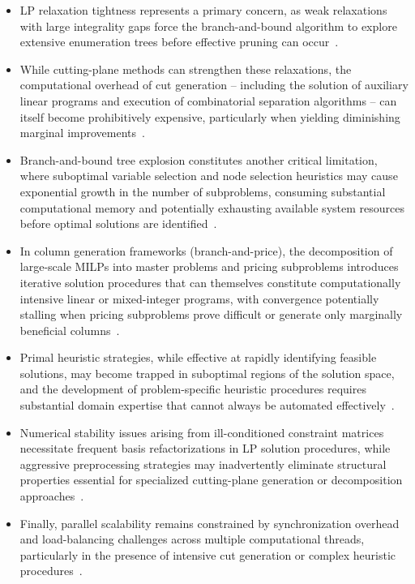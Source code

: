 \documentclass{oqireport}
\begin{document}
\begin{itemize}


\item LP relaxation tightness represents a primary concern, as weak relaxations with large integrality gaps force the branch-and-bound algorithm to explore extensive enumeration trees before effective pruning can occur~\cite{nemhauser1999integer}.

\item While cutting-plane methods can strengthen these relaxations, the computational overhead of cut generation -- including the solution of auxiliary linear programs and execution of combinatorial separation algorithms -- can itself become prohibitively expensive, particularly when yielding diminishing marginal improvements~\cite{mitchell2002cutting}.

\item Branch-and-bound tree explosion constitutes another critical limitation, where suboptimal variable selection and node selection heuristics may cause exponential growth in the number of subproblems, consuming substantial computational memory and potentially exhausting available system resources before optimal solutions are identified~\cite{linderoth2005anatomy}.

\item In column generation frameworks (branch-and-price), the decomposition of large-scale MILPs into master problems and pricing subproblems introduces iterative solution procedures that can themselves constitute computationally intensive linear or mixed-integer programs, with convergence potentially stalling when pricing subproblems prove difficult or generate only marginally beneficial columns~\cite{lubbecke2005selected}.

\item Primal heuristic strategies, while effective at rapidly identifying feasible solutions, may become trapped in suboptimal regions of the solution space, and the development of problem-specific heuristic procedures requires substantial domain expertise that cannot always be automated effectively~\cite{berthold2013heuristic}.

\item Numerical stability issues arising from ill-conditioned constraint matrices necessitate frequent basis refactorizations in LP solution procedures, while aggressive preprocessing strategies may inadvertently eliminate structural properties essential for specialized cutting-plane generation or decomposition approaches~\cite{gamrath2015structure}.

\item Finally, parallel scalability remains constrained by synchronization overhead and load-balancing challenges across multiple computational threads, particularly in the presence of intensive cut generation or complex heuristic procedures~\cite{shinano2018parallelization}. 

\end{itemize}
\end{document}

